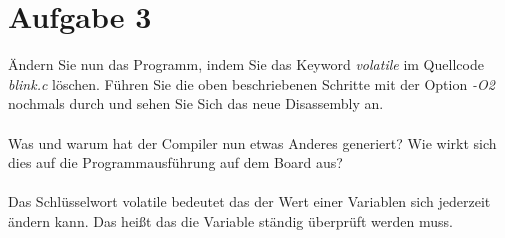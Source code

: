 \section{Aufgabe 3}
Ändern Sie nun das Programm, indem Sie das Keyword \textit{volatile} im Quellcode \textit{blink.c} löschen. Führen Sie die oben beschriebenen Schritte mit der Option \textit{-O2} nochmals durch und sehen Sie Sich das neue Disassembly an.\\ \\
Was und warum hat der Compiler nun etwas Anderes generiert? Wie wirkt sich dies auf die Programmausführung auf dem Board aus?\\ \\
Das Schlüsselwort volatile bedeutet das der Wert einer Variablen sich jederzeit ändern kann. Das hei\ss{}t das die Variable ständig überprüft werden muss.\\
